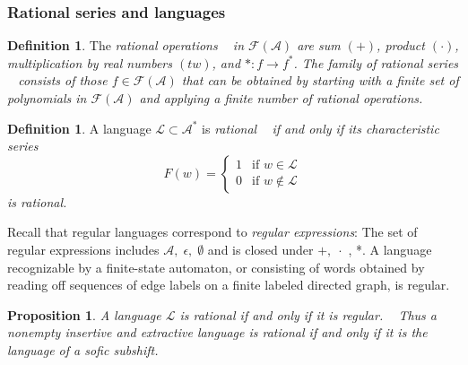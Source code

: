 \documentclass{kepart2010}
\theoremstyle{plain}
\newtheorem{prop}[thm]{Proposition}
\theoremstyle{definition}
\newtheorem{defn}[thm]{Definition}
\theoremstyle{remark}
\theoremstyle{definition}
\numberwithin{equation}{section}
\begin{document}
\subsubsection{Rational series and languages}

\begin{defn}
The \em rational operations \em~ in ${\mathcal F ({{\mathcal A}})}$ are sum $(+)$, product
$(\cdot)$, multiplication by real numbers $(tw)$, and $*: f
\rightarrow f^{*}$. The family of \em rational series \em~ consists
of those $f \in {\mathcal F ({{\mathcal A}})}$ that can be obtained by starting with a finite
set of polynomials in ${\mathcal F ({{\mathcal A}})}$ and applying a finite number of rational
operations.
\end{defn}
\begin{defn}
A language $\mathcal{L} \subset {{\mathcal A}}^{*}$ is \em rational \em~ if and
only if its characteristic series
 \begin{equation}
 F(w) =    \begin{cases}   1 & \text{if $w \in \mathcal{L}$} \\
     0 &    \text{if $w \notin \mathcal{L}$}
     \end{cases}
     \end{equation}
is rational.
\end{defn}

Recall that regular languages correspond to {\em regular
expressions}: The set of regular expressions includes ${{\mathcal A}}, \;
\epsilon, \; \emptyset$ and is closed under $+, \; \cdot$ , *. A
language recognizable by a finite-state automaton, or consisting of
words obtained by reading off sequences of edge labels on a finite
labeled directed graph, is regular.

\begin{prop}
A language $\mathcal{L}$ is rational if and only if it is \em
regular. \em~ Thus a nonempty
 insertive and extractive language is rational
if and only if it is the language of a sofic subshift.
\end{prop}
\end{document}
